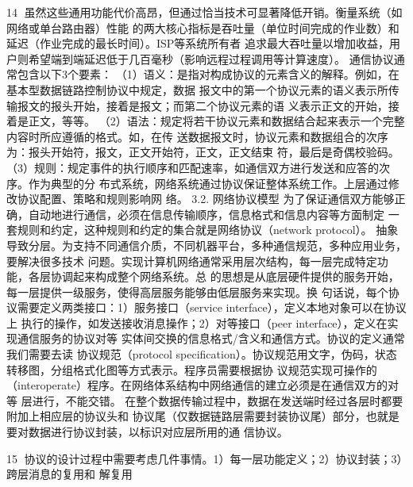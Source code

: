                                                     14
虽然这些通用功能代价高昂，但通过恰当技术可显著降低开销。衡量系统（如网络或单台路由器）性能
的两大核心指标是吞吐量（单位时间完成的作业数）和延迟（作业完成的最长时间）。ISP等系统所有者
追求最大吞吐量以增加收益，用户则希望端到端延迟低于几百毫秒（影响远程过程调用等计算速度）。
通信协议通常包含以下3个要素：
（1）语义：是指对构成协议的元素含义的解释。例如，在基本型数据链路控制协议中规定，数据
报文中的第一个协议元素的语义表示所传输报文的报头开始，接着是报文；而第二个协议元素的语
义表示正文的开始，接着是正文，等等。
（2）语法：规定将若干协议元素和数据结合起来表示一个完整内容时所应遵循的格式。如，在传
送数据报文时，协议元素和数据组合的次序为：报头开始符，报文，正文开始符，正文，正文结束
符，最后是奇偶校验码。
（3）规则：规定事件的执行顺序和匹配速率，如通信双方进行发送和应答的次序。作为典型的分
布式系统，网络系统通过协议保证整体系统工作。上层通过修改协议配置、策略和规则影响网
络。
3.2.   网络协议模型
为了保证通信双方能够正确，自动地进行通信，必须在信息传输顺序，信息格式和信息内容等方面制定
一套规则和约定，这种规则和约定的集合就是网络协议（network protocol）。
抽象导致分层。为支持不同通信介质，不同机器平台，多种通信规范，多种应用业务，要解决很多技术
问题。实现计算机网络通常采用层次结构，每一层完成特定功能，各层协调起来构成整个网络系统。总
的思想是从底层硬件提供的服务开始， 每一层提供一级服务，使得高层服务能够由低层服务来实现。换
句话说，每个协议需要定义两类接口：1）服务接口（service interface），定义本地对象可以在协议上
执行的操作，如发送接收消息操作；2）对等接口（peer interface），定义在实现通信服务的协议对等
实体间交换的信息格式/含义和通信方式。协议的定义通常我们需要去读 协议规范（protocol
specification）。协议规范用文字，伪码，状态转移图，分组格式化图等方式表示。程序员需要根据协
议规范实现可操作的（interoperate）程序。在网络体系结构中网络通信的建立必须是在通信双方的对等
层进行，不能交错。 在整个数据传输过程中，数据在发送端时经过各层时都要附加上相应层的协议头和
协议尾（仅数据链路层需要封装协议尾）部分，也就是要对数据进行协议封装，以标识对应层所用的通
信协议。




                                                     15
协议的设计过程中需要考虑几件事情。1）每一层功能定义；2）协议封装；3）跨层消息的复用和
解复用

